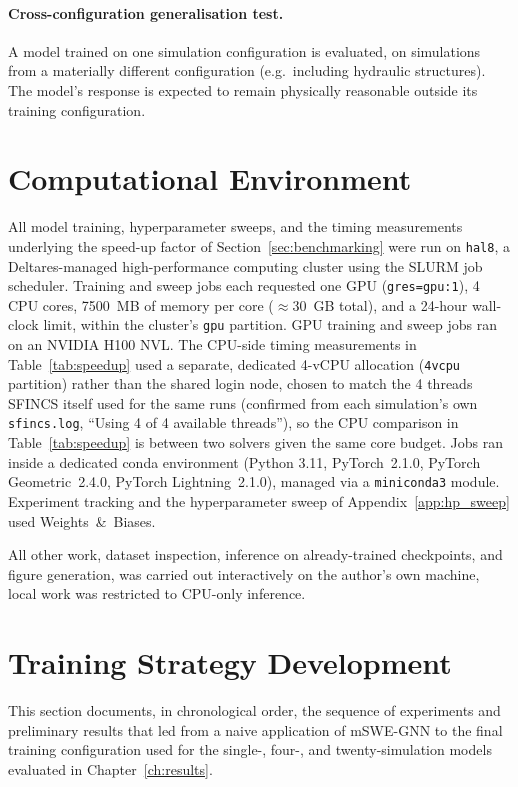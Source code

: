 \documentclass[12pt,a4paper]{report}
\begin{document}
{\paragraph{Cross-configuration generalisation test.} A model trained on one simulation configuration is evaluated, on simulations from a materially different configuration (e.g.\ including hydraulic structures). The model's response is expected to remain physically reasonable outside its training configuration.
 
\section{Computational Environment}
\label{sec:compute_environment}

All model training, hyperparameter sweeps, and the timing measurements underlying
the speed-up factor of Section~\ref{sec:benchmarking} were run on \texttt{hal8}, a
Deltares-managed high-performance computing cluster using the SLURM job scheduler.
Training and sweep jobs each requested one GPU (\texttt{gres=gpu:1}), 4 CPU
cores, 7500~MB of memory per core ($\approx$30~GB total), and a 24-hour
wall-clock limit, within the cluster's \texttt{gpu} partition.
GPU training and sweep jobs ran on an NVIDIA H100 NVL.  The CPU-side timing
measurements in Table~\ref{tab:speedup} used a separate, dedicated 4-vCPU
allocation (\texttt{4vcpu} partition) rather than the shared login node, chosen
to match the 4 threads SFINCS itself used for the same runs (confirmed from
each simulation's own \texttt{sfincs.log}, ``Using 4 of 4 available threads''),
so the CPU comparison in Table~\ref{tab:speedup} is between two solvers given
the same core budget. Jobs ran inside a dedicated conda
environment (Python 3.11, PyTorch~2.1.0, PyTorch Geometric~2.4.0, PyTorch
Lightning~2.1.0), managed via a \texttt{miniconda3} module. Experiment tracking
and the hyperparameter sweep of Appendix~\ref{app:hp_sweep} used Weights~\&~Biases.

All other work, dataset inspection, inference on already-trained checkpoints,
and figure generation, was carried out interactively on the author's own
machine, local work was restricted to CPU-only inference.


\section{Training Strategy Development}
\label{sec:training_strategy_dev}

This section documents, in chronological order, the sequence of experiments and
preliminary results that led from a naive application of mSWE-GNN to the final training configuration used for the
single-, four-, and twenty-simulation models evaluated in
Chapter~\ref{ch:results}.

}
\end{document}
